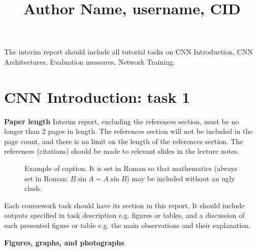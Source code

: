 \documentclass[10pt,twocolumn,letterpaper]{article}
\begin{document}
\title{Author Name, username, CID}



\maketitle

The interim report should include all tutorial tasks on CNN Introduction, CNN Architectures, Evaluation measures, Network Training.


\section{CNN Introduction: task 1}


{ \bf Paper length} Interim report, excluding the references section,
must be no longer than 2 pages in length. The references section
will not be included in the page count, and there is no limit on the
length of the references section. The references (citations) should be made to relevant slides in the lecture notes.



\begin{figure}[t]
\begin{center}
\fbox{\rule{0pt}{1in} \rule{0.8\linewidth}{0pt}}
\end{center}
   \caption{Example of caption.  It is set in Roman so that mathematics
   (always set in Roman: $B \sin A = A \sin B$) may be included without an
   ugly clash.}
\label{fig:long}
\label{fig:onecol}
\end{figure}


Each coursework task should have its section in this report. It should include outputs specified in task description e.g. figures or tables, and a discussion of each presented figure or table e.g. the main observations and their explanation. 


{\bf Figures, graphs, and photographs}
\end{document}
